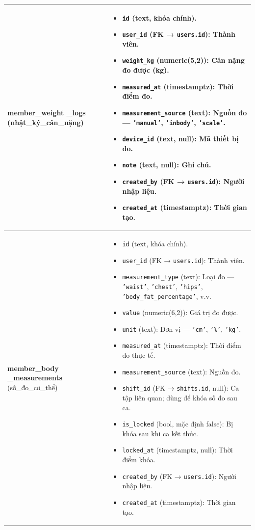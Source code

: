 \begin{longtable}{|>{\centering\arraybackslash}m{4.5cm}|>{\raggedright\arraybackslash}m{11.5cm}|}
\textbf{member\_weight \_logs} \newline (nhật\_ký\_cân\_nặng) &
\begin{itemize}
    \item \texttt{id} (text, khóa chính).
    \item \texttt{user\_id} (FK → \texttt{users.id}): Thành viên.
    \item \texttt{weight\_kg} (numeric(5,2)): Cân nặng đo được (kg).
    \item \texttt{measured\_at} (timestamptz): Thời điểm đo.
    \item \texttt{measurement\_source} (text): Nguồn đo — \texttt{'manual'}, \texttt{'inbody'}, \texttt{'scale'}.
    \item \texttt{device\_id} (text, null): Mã thiết bị đo.
    \item \texttt{note} (text, null): Ghi chú.
    \item \texttt{created\_by} (FK → \texttt{users.id}): Người nhập liệu.
    \item \texttt{created\_at} (timestamptz): Thời gian tạo.
\end{itemize} \\ \hline

\textbf{member\_body \_measurements} \newline (số\_đo\_cơ\_thể) &
\begin{itemize}
    \item \texttt{id} (text, khóa chính).
    \item \texttt{user\_id} (FK → \texttt{users.id}): Thành viên.
    \item \texttt{measurement\_type} (text): Loại đo — \texttt{'waist'}, \texttt{'chest'}, \texttt{'hips'}, \texttt{'body\_fat\_percentage'}, v.v.
    \item \texttt{value} (numeric(6,2)): Giá trị đo được.
    \item \texttt{unit} (text): Đơn vị — \texttt{'cm'}, \texttt{'\%'}, \texttt{'kg'}.
    \item \texttt{measured\_at} (timestamptz): Thời điểm đo thực tế.
    \item \texttt{measurement\_source} (text): Nguồn đo.
    \item \texttt{shift\_id} (FK → \texttt{shifts.id}, null): Ca tập liên quan; dùng để khóa số đo sau ca.
    \item \texttt{is\_locked} (bool, mặc định false): Bị khóa sau khi ca kết thúc.
    \item \texttt{locked\_at} (timestamptz, null): Thời điểm khóa.
    \item \texttt{created\_by} (FK → \texttt{users.id}): Người nhập liệu.
    \item \texttt{created\_at} (timestamptz): Thời gian tạo.
\end{itemize} \\ \hline


\end{longtable}
